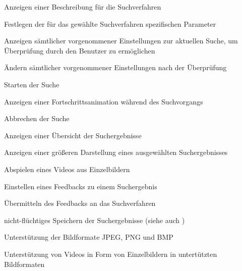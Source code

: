 \begin{description}
	\item[] Anzeigen einer Beschreibung für die Suchverfahren
	\item[] Festlegen der für das gewählte Suchverfahren spezifischen Parameter
	\item[] Anzeigen sämtlicher vorgenommener Einstellungen zur aktuellen Suche, um Überprüfung durch den Benutzer zu ermöglichen
	\item[] Ändern sämtlicher vorgenommener Einstellungen nach der Überprüfung
	\newline
	\item[] Starten der Suche
	\item[] Anzeigen einer Fortschrittsanimation während des Suchvorgangs
	\item[] Abbrechen der Suche
	\newline
	\item[] Anzeigen einer \"Ubersicht der Suchergebnisse
	\item[] Anzeigen einer größeren Darstellung eines ausgewählten Suchergebnisses
	\item[] Abspielen eines Videos aus Einzelbildern
	\item[] Einstellen eines Feedbacks zu einem Suchergebnis
	\item[] \"Ubermitteln des Feedbacks an das Suchverfahren
	\item[] nicht-flüchtiges Speichern der Suchergebnisse (siehe auch )
	\newline
	\item[] Unterstützung der Bildformate JPEG, PNG und BMP
	\item[] Unterstützung von Videos in Form von Einzelbildern in untert\"utzten Bildformaten
\end{description}

